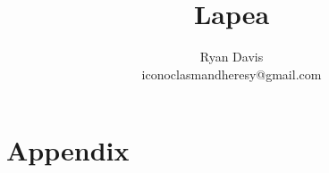 \documentclass[letterpaper,10pt,twocolumn,openany]{book}
\author{Ryan Davis\\iconoclasmandheresy@gmail.com}
\title{Lapea}
\begin{document}
\maketitle
\frontmatter
\tableofcontents

\mainmatter


\backmatter
\part{Appendix}
\end{document}
